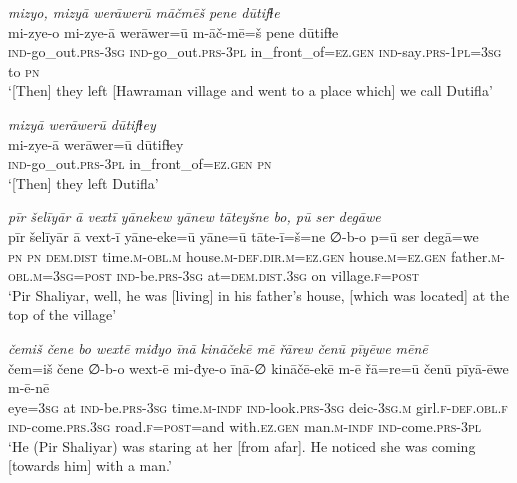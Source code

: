 \ea \label{ZP.63}
\textit{mizyo, mizyā werāwerū māčmēš pene dūtifɫe} \\ 
\gll mi-zye-o mi-zye-ā werāwer=ū m-āč-mē=š pene dūtifɫe \\ 
 \textsc{ind-}go\_out\textsc{.prs}\textsc{-3sg} \textsc{ind-}go\_out\textsc{.prs}\textsc{-3pl} in\_front\_of\textsc{\textsc{=ez.gen}} \textsc{ind-}say\textsc{.prs}\textsc{-1pl}\textsc{=3sg} to \textsc{pn} \\ 
\glt `[Then] they left [Hawraman village and went to a place which] we call Dutifla'
\z 
 
\ea \label{ZP.64}
\textit{mizyā werāwerū dūtifɫey} \\ 
\gll mi-zye-ā werāwer=ū dūtifɫey \\ 
 \textsc{ind-}go\_out\textsc{.prs}\textsc{-3pl} in\_front\_of\textsc{\textsc{=ez.gen}} \textsc{pn} \\ 
\glt `[Then] they left Dutifla'
\z 
 
\ea \label{ZP.65}
\textit{pīr šelīyār ā vextī yānekew yānew tāteyšne bo, pū ser degāwe} \\ 
\gll pīr šelīyār ā vext-ī yāne-eke=ū yāne=ū tāte-ī=š=ne ∅-b-o p=ū ser degā=we \\ 
 \textsc{pn} \textsc{pn} \textsc{dem.dist} time\textsc{.m}\textsc{-obl}\textsc{.m} house\textsc{.m}\textsc{-def}\textsc{.dir}\textsc{.m}\textsc{\textsc{=ez.gen}} house\textsc{.m}\textsc{\textsc{=ez.gen}} father\textsc{.m}\textsc{-obl}\textsc{.m}\textsc{=3sg}\textsc{=\textsc{post}} \textsc{ind-}be\textsc{.prs}\textsc{-3sg} at=\textsc{dem.dist}\textsc{.3sg} on village\textsc{.f}\textsc{=\textsc{post}} \\ 
\glt `Pir Shaliyar, well, he was [living] in his father’s house, [which was located] at the top of the village'
\z 
 
\ea \label{ZP.66}
\textit{čemiš čene bo wextē miđyo īnā kināčekē mē řārew čenū pīyēwe mēnē} \\ 
\gll čem=iš čene ∅-b-o wext-ē mi-đye-o īnā-∅ kināčē-ekē m-ē řā=re=ū čenū pīyā-ēwe m-ē-nē \\ 
 eye\textsc{=3sg} at \textsc{ind-}be\textsc{.prs}\textsc{-3sg} time\textsc{.m}\textsc{-indf} \textsc{ind-}look\textsc{.prs}\textsc{-3sg} deic\textsc{-3sg}\textsc{.m} girl\textsc{.f}\textsc{-def}\textsc{.obl}\textsc{.f} \textsc{ind-}come\textsc{.prs}\textsc{.3sg} road\textsc{.f}\textsc{=\textsc{post}}=and with\textsc{.ez.gen} man\textsc{.m}\textsc{-indf} \textsc{ind-}come\textsc{.prs}\textsc{-3pl} \\ 
\glt `He (Pir Shaliyar) was staring at her [from afar]. He noticed she was coming [towards him] with a man.'
\z 
 
